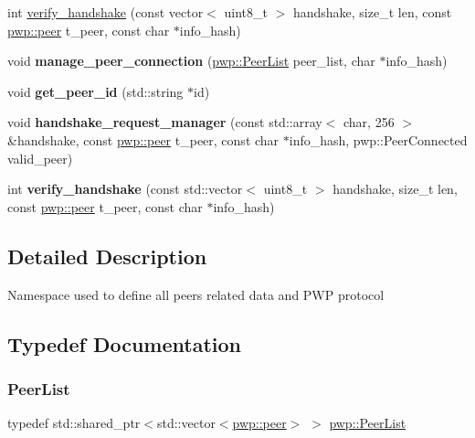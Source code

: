 \begin{DoxyCompactItemize}
int \hyperlink{namespacepwp_a58c780495f2139a56b95662dc7c0345f}{verify\+\_\+handshake} (const vector$<$ uint8\+\_\+t $>$ handshake, size\+\_\+t len, const \hyperlink{structpwp_1_1peer}{pwp\+::peer} t\+\_\+peer, const char $\ast$info\+\_\+hash)
\item 
\mbox{\label{namespacepwp_ab82c0d015f6ba23e766c4b942a125b5f}} 
void {\bfseries manage\+\_\+peer\+\_\+connection} (\hyperlink{namespacepwp_ad07fa6df116b205302ad5ec172277184}{pwp\+::\+Peer\+List} peer\+\_\+list, char $\ast$info\+\_\+hash)
\item 
\mbox{\label{namespacepwp_a5f03cde749af88a393c999545830b192}} 
void {\bfseries get\+\_\+peer\+\_\+id} (std\+::string $\ast$id)
\item 
\mbox{\label{namespacepwp_ae2eeca61e271fabff5fa45308396009e}} 
void {\bfseries handshake\+\_\+request\+\_\+manager} (const std\+::array$<$ char, 256 $>$ \&handshake, const \hyperlink{structpwp_1_1peer}{pwp\+::peer} t\+\_\+peer, const char $\ast$info\+\_\+hash, pwp\+::\+Peer\+Connected valid\+\_\+peer)
\item 
\mbox{\label{namespacepwp_aed118903b8345e62507ade49c6032d32}} 
int {\bfseries verify\+\_\+handshake} (const std\+::vector$<$ uint8\+\_\+t $>$ handshake, size\+\_\+t len, const \hyperlink{structpwp_1_1peer}{pwp\+::peer} t\+\_\+peer, const char $\ast$info\+\_\+hash)
\end{DoxyCompactItemize}


\subsection{Detailed Description}
Namespace used to define all peer\textquotesingle{}s related data and P\+WP protocol 

\subsection{Typedef Documentation}
\mbox{\label{namespacepwp_ad07fa6df116b205302ad5ec172277184}} 
\subsubsection{\texorpdfstring{Peer\+List}{PeerList}}
{\footnotesize\ttfamily typedef std\+::shared\+\_\+ptr$<$std\+::vector$<$\hyperlink{structpwp_1_1peer}{pwp\+::peer}$>$ $>$ \hyperlink{namespacepwp_ad07fa6df116b205302ad5ec172277184}{pwp\+::\+Peer\+List}}

